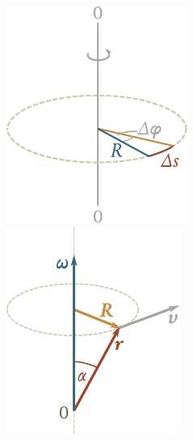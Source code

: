 \begin{figure}[t]
	\begin{minipage}[t]{0.5\linewidth}
		\begin{center}
			\includegraphics[scale=1]{figures/ch_01/fig_1_32.pdf}
			\caption[]{}
			\label{fig:1_32}
		\end{center}
	\end{minipage}
	\hspace{-0.1cm}
	\begin{minipage}[t]{0.5\linewidth}
		\begin{center}
			\includegraphics[scale=1]{figures/ch_01/fig_1_33.pdf}
			\caption[]{}
			\label{fig:1_33}
		\end{center}
	\end{minipage}
	\vspace{-0.6cm}
\end{figure}

